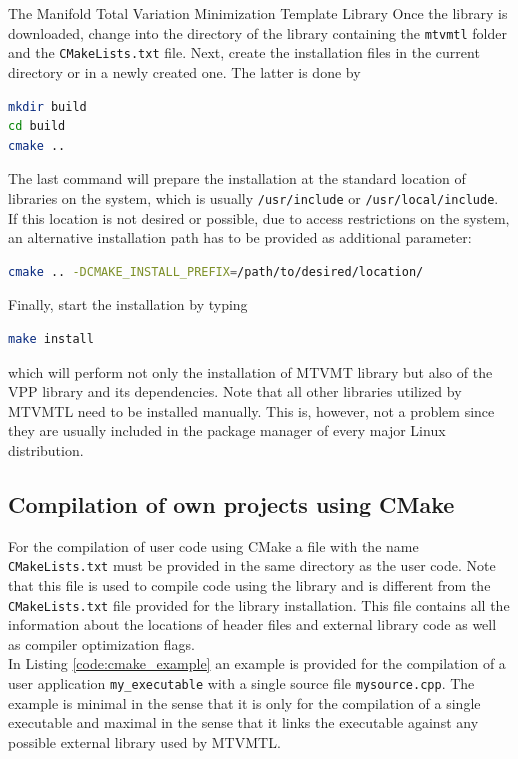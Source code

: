 \begin{chapter}{The Manifold Total Variation Minimization Template Library}
Once the library is downloaded, change into the directory of the library containing 
the \texttt{mtvmtl} folder and the \texttt{CMakeLists.txt} file.
Next, create the installation files in the current directory or in a newly created one. The latter is
done by
\begin{lstlisting}[language=bash]
mkdir build
cd build
cmake ..
\end{lstlisting}
The last command will prepare the installation at the standard location of libraries on the system, which is usually
\texttt{/usr/include} or \texttt{/usr/local/include}. If this location is not desired or possible, due to
access restrictions on the system, an alternative installation path has to be provided as additional parameter:
\begin{lstlisting}[language=bash]
cmake .. -DCMAKE_INSTALL_PREFIX=/path/to/desired/location/
\end{lstlisting}

Finally, start the installation by typing
\begin{lstlisting}[language=bash]
make install
\end{lstlisting}
which will perform not only the installation of MTVMT library but also of the VPP library and its dependencies. Note that
all other libraries utilized by MTVMTL need to be installed manually. This is, however, not a problem since they are usually
included in the package manager of every major Linux distribution.

\subsection{Compilation of own projects using CMake} %
\label{sub:CMakeCompilation}
For the compilation of user code using CMake a file with the name \texttt{CMakeLists.txt} must be provided in the same directory as the user code. Note that this file is used to compile code using the library and is different from the \texttt{CMakeLists.txt} file provided
for the library installation. This file contains all the information about the locations of header files and external library code as well as compiler optimization flags. \\

In Listing \ref{code:cmake_example} 
an example is provided for the compilation of a user application \texttt{my\_executable} with a single source file \texttt{mysource.cpp}. 
The example is minimal in the sense that it is only for the compilation of a single executable and maximal in the sense that it
links the executable against any possible external library used by MTVMTL.\\


\end{chapter}
